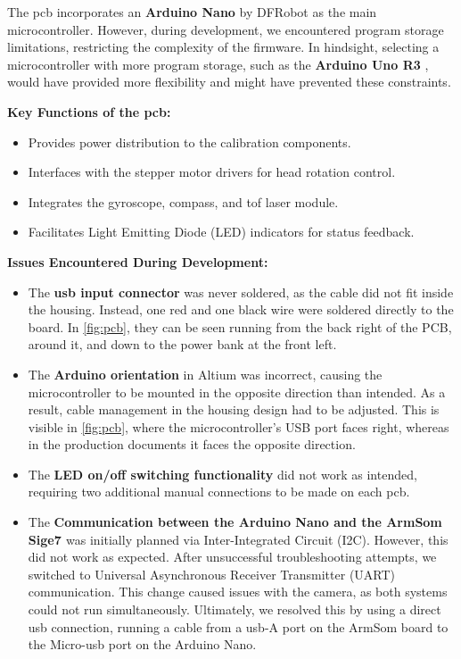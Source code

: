
The \acrshort{pcb} incorporates an \textbf{Arduino Nano} by DFRobot \cite{arduino_nano_dfrobot} as the main microcontroller. However, during development, we encountered program storage limitations, restricting the complexity of the firmware. In hindsight, selecting a microcontroller with more program storage, such as the \textbf{Arduino Uno R3} \cite{arduino_uno_dfrobot}, would have provided more flexibility and might have prevented these constraints.

\textbf{Key Functions of the \acrshort{pcb}:}
\begin{itemize}
	\item Provides power distribution to the calibration components.
	\item Interfaces with the stepper motor drivers for head rotation control.
	\item Integrates the gyroscope, compass, and \acrshort{tof} laser module.
	\item Facilitates Light Emitting Diode (LED) indicators for status feedback.
\end{itemize}

\textbf{Issues Encountered During Development:}
\begin{itemize}
	\item The \textbf{\acrshort{usb} input connector} was never soldered, as the cable did not fit inside the housing. Instead, one red and one black wire were soldered directly to the board. In \autoref{fig:pcb}, they can be seen running from the back right of the PCB, around it, and down to the power bank at the front left.
	\item The \textbf{Arduino orientation} in Altium was incorrect, causing the microcontroller to be mounted in the opposite direction than intended. As a result, cable management in the housing design had to be adjusted. This is visible in \autoref{fig:pcb}, where the microcontroller’s USB port faces right, whereas in the production documents it faces the opposite direction.
	\item The \textbf{LED on/off switching functionality} did not work as intended, requiring two additional manual connections to be made on each \acrshort{pcb}.
	\item The \textbf{Communication between the Arduino Nano \cite{arduino_nano_dfrobot} and the ArmSom Sige7 \cite{armsom_sige7}} was initially planned via Inter-Integrated Circuit (I2C). However, this did not work as expected. After unsuccessful troubleshooting attempts, we switched to Universal Asynchronous Receiver Transmitter (UART) communication. This change caused issues with the camera, as both systems could not run simultaneously. Ultimately, we resolved this by using a direct \acrshort{usb} connection, running a cable from a \acrshort{usb}-A port on the ArmSom board to the Micro-\acrshort{usb} port on the Arduino Nano.
\end{itemize}

